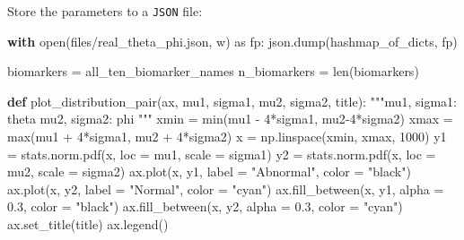 \documentclass[
  letterpaper,
  DIV=11,
  numbers=noendperiod]{scrreprt}
\newenvironment{Shaded}{\begin{snugshade}}{\end{snugshade}}
\newcommand{\BuiltInTok}[1]{\textcolor[rgb]{0.00,0.23,0.31}{#1}}
\newcommand{\CommentTok}[1]{\textcolor[rgb]{0.37,0.37,0.37}{#1}}
\newcommand{\ControlFlowTok}[1]{\textcolor[rgb]{0.00,0.23,0.31}{\textbf{#1}}}
\newcommand{\DecValTok}[1]{\textcolor[rgb]{0.68,0.00,0.00}{#1}}
\newcommand{\FloatTok}[1]{\textcolor[rgb]{0.68,0.00,0.00}{#1}}
\newcommand{\ImportTok}[1]{\textcolor[rgb]{0.00,0.46,0.62}{#1}}
\newcommand{\KeywordTok}[1]{\textcolor[rgb]{0.00,0.23,0.31}{\textbf{#1}}}
\newcommand{\NormalTok}[1]{\textcolor[rgb]{0.00,0.23,0.31}{#1}}
\newcommand{\OperatorTok}[1]{\textcolor[rgb]{0.37,0.37,0.37}{#1}}
\newcommand{\StringTok}[1]{\textcolor[rgb]{0.13,0.47,0.30}{#1}}
\begin{document}
Store the parameters to a \texttt{JSON} file:

\begin{Shaded}
\begin{Highlighting}[]
\ControlFlowTok{with} \BuiltInTok{open}\NormalTok{(}\StringTok{\textquotesingle{}files/real\_theta\_phi.json\textquotesingle{}}\NormalTok{, }\StringTok{\textquotesingle{}w\textquotesingle{}}\NormalTok{) }\ImportTok{as}\NormalTok{ fp:}
\NormalTok{    json.dump(hashmap\_of\_dicts, fp)}
\end{Highlighting}
\end{Shaded}

\begin{Shaded}
\begin{Highlighting}[]
\NormalTok{biomarkers }\OperatorTok{=}\NormalTok{ all\_ten\_biomarker\_names}
\NormalTok{n\_biomarkers }\OperatorTok{=} \BuiltInTok{len}\NormalTok{(biomarkers)}

\KeywordTok{def}\NormalTok{ plot\_distribution\_pair(ax, mu1, sigma1, mu2, sigma2, title):}
    \CommentTok{"""mu1, sigma1: theta}
\CommentTok{    mu2, sigma2: phi}
\CommentTok{    """}
\NormalTok{    xmin }\OperatorTok{=} \BuiltInTok{min}\NormalTok{(mu1 }\OperatorTok{{-}} \DecValTok{4}\OperatorTok{*}\NormalTok{sigma1, mu2}\OperatorTok{{-}}\DecValTok{4}\OperatorTok{*}\NormalTok{sigma2)}
\NormalTok{    xmax }\OperatorTok{=} \BuiltInTok{max}\NormalTok{(mu1 }\OperatorTok{+} \DecValTok{4}\OperatorTok{*}\NormalTok{sigma1, mu2 }\OperatorTok{+} \DecValTok{4}\OperatorTok{*}\NormalTok{sigma2)}
\NormalTok{    x }\OperatorTok{=}\NormalTok{ np.linspace(xmin, xmax, }\DecValTok{1000}\NormalTok{)}
\NormalTok{    y1 }\OperatorTok{=}\NormalTok{ stats.norm.pdf(x, loc }\OperatorTok{=}\NormalTok{ mu1, scale }\OperatorTok{=}\NormalTok{ sigma1)}
\NormalTok{    y2 }\OperatorTok{=}\NormalTok{ stats.norm.pdf(x, loc }\OperatorTok{=}\NormalTok{ mu2, scale }\OperatorTok{=}\NormalTok{ sigma2)}
\NormalTok{    ax.plot(x, y1, label }\OperatorTok{=} \StringTok{"Abnormal"}\NormalTok{, color }\OperatorTok{=} \StringTok{"black"}\NormalTok{)}
\NormalTok{    ax.plot(x, y2, label }\OperatorTok{=} \StringTok{"Normal"}\NormalTok{, color }\OperatorTok{=} \StringTok{"cyan"}\NormalTok{)}
\NormalTok{    ax.fill\_between(x, y1, alpha }\OperatorTok{=} \FloatTok{0.3}\NormalTok{, color }\OperatorTok{=} \StringTok{"black"}\NormalTok{)}
\NormalTok{    ax.fill\_between(x, y2, alpha }\OperatorTok{=} \FloatTok{0.3}\NormalTok{, color }\OperatorTok{=} \StringTok{"cyan"}\NormalTok{)}
\NormalTok{    ax.set\_title(title)}
\NormalTok{    ax.legend()}


\end{Highlighting}
\end{Shaded}
\end{document}
